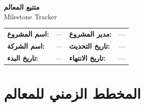 \documentclass[11pt,a4paper]{article}
\begin{document}
\begin{center}
{\LARGE\bfseries متتبع المعالم}\\[0.3em]
{\large Milestone Tracker}\\[1em]
\end{center}

\begin{table}[H]
\centering
\renewcommand{\arraystretch}{1.4}
\begin{tabularx}{\textwidth}{L{3.5cm} X L{3.5cm} X}
\toprule
\textbf{اسم المشروع:} & --- & \textbf{مدير المشروع:} & --- \\
\textbf{اسم الشركة:} & --- & \textbf{تاريخ التحديث:} & --- \\
\textbf{تاريخ البدء:} & --- & \textbf{تاريخ الانتهاء:} & --- \\
\bottomrule
\end{tabularx}
\end{table}

\vspace{1em}

\section{المخطط الزمني للمعالم}
\label{sec:timeline}
\end{document}
